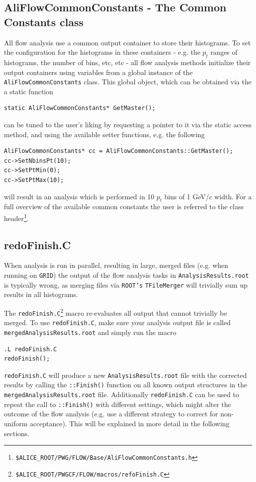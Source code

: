 \documentclass[a4paper]{book}
\numberwithin{equation}{subsection}
\begin{document}
\subsection{AliFlowCommonConstants - The Common Constants class}
All flow analysis use a common output container to store their histograms. To set the configuration for the histograms in these containers - e.g. the $p_t$ ranges of histograms, the number of bins, etc, etc - all flow analysis methods initialize their output containers using variables from a global instance of the \texttt{AliFlowCommonConstants} class. This global object, which can be obtained via the a static function
\begin{lstlisting}
static AliFlowCommonConstants* GetMaster(); \end{lstlisting} 
can be tuned to the  user's liking by requesting a pointer to it via the static access method, and using the available setter functions, e.g. the following
\begin{lstlisting}
AliFlowCommonConstants* cc = AliFlowCommonConstants::GetMaster();
cc->SetNbinsPt(10);
cc->SetPtMin(0);
cc->SetPtMax(10); \end{lstlisting}
will result in an analysis which is performed in 10 $p_t$ bins of 1 GeV/$c$ width. For a full overview of the available common constants the user is referred to the class header\footnote{\texttt{\$ALICE\_ROOT/PWG/FLOW/Base/AliFlowCommonConstants.h}}.


\subsection{redoFinish.C}
 When analysis is run in parallel, resulting in large, merged files (e.g. when running on \texttt{GRID}) the output of the flow analysis tasks in \texttt{AnalysisResults.root} is typically wrong, as merging files via \texttt{ROOT's} \texttt{TFileMerger} will trivially sum up results in all histograms. 

The \texttt{redoFinish.C}\footnote{\texttt{\$ALICE\_ROOT/PWGCF/FLOW/macros/refoFinish.C}} macro re-evaluates all output that cannot trivially be merged. To use \texttt{redoFinish.C}, make sure your analysis output file is called \texttt{mergedAnalysisResults.root} and simply run the macro
\begin{lstlisting}
.L redoFinish.C
redoFinish(); \end{lstlisting}
\texttt{redoFinish.C} will produce a new \texttt{AnalysisResults.root} file with the corrected results by calling the \texttt{::Finish()} function on all known output structures in the \texttt{mergedAnalysisResults.root} file. Additionally \texttt{redoFinish.C} can be used to repeat the call to \texttt{::Finish()} with different settings, which might alter the outcome of the flow analysis (e.g. use a different strategy to correct for non-uniform acceptance). This will be explained in more detail in the following sections. 
\end{document}
